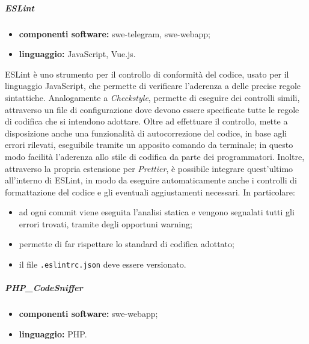 				\subparagraph{ESLint} 
				
					\begin{itemize}
						\item \textbf{componenti software:} swe-telegram, swe-webapp;
						\item \textbf{linguaggio:} JavaScript, Vue.js.
					\end{itemize}
					
					ESLint è uno strumento per il controllo di conformità del codice, usato per il linguaggio JavaScript, che permette di verificare l'aderenza a delle precise regole sintattiche.
					\newline
					Analogamente a \textit{Checkstyle}, permette di eseguire dei controlli simili, attraverso un file di configurazione dove devono essere specificate tutte le regole di codifica che si intendono adottare.
					\newline
					Oltre ad effettuare il controllo, mette a disposizione anche una funzionalità di autocorrezione del codice, in base agli errori rilevati, eseguibile tramite un apposito comando da terminale; in questo modo facilità l'aderenza allo stile di codifica da parte dei programmatori.
					\newline
					Inoltre, attraverso la propria estensione per \textit{Prettier}, è possibile integrare quest'ultimo all'interno di ESLint, in modo da eseguire automaticamente anche i controlli di formattazione del codice e gli eventuali aggiustamenti necessari. In particolare:
					\begin{itemize}
						\item ad ogni commit viene eseguita l'analisi statica e vengono segnalati tutti gli errori trovati, tramite degli opportuni warning;
						\item permette di far rispettare lo standard di codifica adottato;
						\item il file \verb!.eslintrc.json! deve essere versionato.
					\end{itemize}
				
				\subparagraph{PHP\_CodeSniffer} 
				
					\begin{itemize}
						\item \textbf{componenti software:} swe-webapp;
						\item \textbf{linguaggio:} PHP.
					\end{itemize}
					
